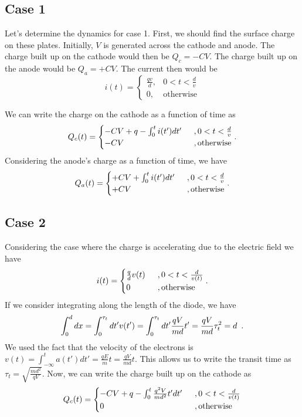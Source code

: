 \documentclass{article}
\begin{document}
\subsection{Case 1}
\label{sub:case_1}


Let's determine the dynamics for case 1. First, we should find the surface
charge on these plates. Initially, $ V $ is generated across the cathode and
anode. The charge
built up on the cathode would then be $ Q_{c} = -CV $. The charge built up on
the anode would be $ Q_{a} = +CV $. The current then would be
\[
   i(t) = \begin{cases}
      \frac{qv}{d}, & 0 < t < \frac{d}{v}  \\
      0, &\text{otherwise}
   \end{cases}
\]

We can write the charge on the cathode as a function of time as
\[
   Q_{c}(t) =
   \begin{cases}
       -CV + q - \int_{0}^{t} i(t') dt' & \enskip, 0 < t <
      \frac{d}{v} \\
      -CV & \enskip,\text{otherwise}
   \end{cases} .
\]
Considering the anode's charge as a function of time, we have
\[
   Q_{a}(t) =
   \begin{cases}
       +CV + \int_{0}^{t} i(t') dt' & \enskip, 0 < t <
      \frac{d}{v} \\
      +CV & \enskip,\text{otherwise}
   \end{cases} .
\]
\subsection{Case 2}
\label{sub:case_2}
Considering the case where the charge is accelerating due to the electric field
we have
\[
   i(t) = \begin{cases}
      \frac{q}{d}v(t) &\enskip, 0 < t < \frac{d}{v(t)} \\
      0 &\enskip, \text{otherwise} \\
   \end{cases}.
\]
If we consider integrating along the length of the diode, we have
\[
   \int_{0}^{d} dx = \int_{0}^{\tau_{t}} dt' v(t') = \int_{0}^{\tau_{t}}dt'
   \frac{qV}{md} t' = \frac{qV}{md}\tau_{t}^{2} = d \enskip.
\]
We used the fact that the velocity of the electrons is $ v(t) =
\int_{-\infty}^{t}a(t') dt' = \frac{qE}{m}t = \frac{qV}{md}t $. This allows us
to write the transit time as $ \tau_{t} = \sqrt{\frac{m d^{2}}{qV}} $. Now, we
can write the charge built up on the cathode as
\[
   Q_{c}(t) =
   \begin{cases}
      -CV + q - \int_{0}^{t} \frac{q^{2} V}{m d^{2}} t' dt' &\enskip, 0 < t <
      \frac{d}{v(t)} \\
      0 &\enskip, \text{otherwise}
   \end{cases}
\]
\end{document}
